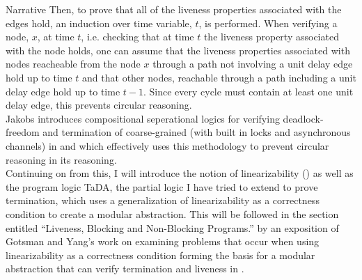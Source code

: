 \documentclass{article}
\begin{document}
\begin{section}{Narrative}
  Then, to prove that all of the liveness properties associated with the edges hold, an induction over time variable, $t$, is performed. When verifying a node, $x$, at time $t$, i.e. checking that at time $t$ the liveness property associated with the node holds, one can assume that the liveness properties associated with nodes reacheable from the node $x$ through a path not involving a unit delay edge hold up to time $t$ and that other nodes, reachable through a path including a unit delay edge hold up to time $t - 1$. Since every cycle must contain at least one unit delay edge, this prevents circular reasoning. \\

  Jakobs introduces compositional seperational logics for verifying deadlock-freedom and termination of coarse-grained (with built in locks and asynchronous channels) in \cite{} and \cite{} which effectively uses this methodology to prevent circular reasoning in its reasoning. \\

  Continuing on from this, I will introduce the notion of linearizability (\cite{Linearizability}) as well as the program logic TaDA, the partial logic I have tried to extend to prove termination, which uses a generalization of linearizability as a correctness condition to create a modular abstraction. This will be followed in the section entitled ``Liveness, Blocking and Non-Blocking Programs.'' by an exposition of Gotsman and Yang's work on examining problems that occur when using linearizability as a correctness condition forming the basis for a modular abstraction that can verify termination and liveness in \cite{LivenessLinearizability}. \\ 
  
\end{section}


 
\end{document}
